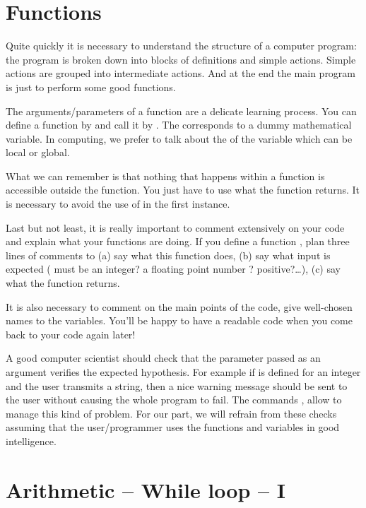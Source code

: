 \documentclass[11pt,class=report,crop=false]{standalone}
\begin{document}
\section{Functions}

Quite quickly it is necessary to understand the structure of a computer program: the program is broken down into blocks of definitions and simple actions. Simple actions are grouped into intermediate actions. And at the end the main program is just to perform some good functions.

The arguments/parameters of a function are a delicate learning process.
You can define a function by  and call it by
. The  corresponds to a dummy mathematical variable. 
In computing, we prefer to talk about the  of the variable which can be local or global.

What we can remember is that nothing that happens within a function is accessible outside the function. You just have to use what the function returns.
It is necessary to avoid the use of  in the first instance.

Last but not least, it is really important to comment extensively on your code and explain what your functions are doing. If you define a function , plan three lines of comments to (a) say what this function does, (b) say what input is expected ( must be an integer? a floating point number ? positive?\ldots), (c) say what the function returns.

It is also necessary to comment on the main points of the code, give well-chosen names to the variables. You'll be happy to have a readable code when you come back to your code again later!

A good computer scientist should check that the parameter passed as an argument verifies the expected hypothesis. For example if  is defined for an integer  and the user transmits a string, then a nice warning message should be sent to the user without causing the whole program to fail.
The commands ,  allow to manage this kind of problem. 
For our part, we will refrain from these checks assuming that the user/programmer uses the functions and variables in good intelligence.


\section{Arithmetic -- While loop -- I}
\end{document}
